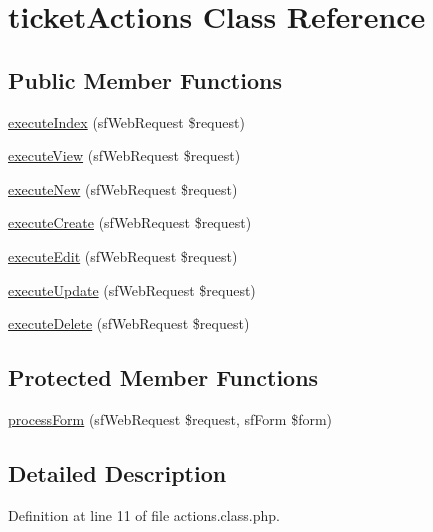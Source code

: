 \hypertarget{classticket_actions}{\section{ticket\-Actions Class Reference}
\label{classticket_actions}
}
\subsection*{Public Member Functions}
\begin{DoxyCompactItemize}
\item 
\hyperlink{classticket_actions_a948cc911eb1d9f77990be54af3b2080f}{execute\-Index} (sf\-Web\-Request \$request)
\item 
\hyperlink{classticket_actions_ad61d212fa3f7e8cb4190700a8a670606}{execute\-View} (sf\-Web\-Request \$request)
\item 
\hyperlink{classticket_actions_a0ffbea56560c6c633dae68ec22aff21c}{execute\-New} (sf\-Web\-Request \$request)
\item 
\hyperlink{classticket_actions_a75837617743fb64dca82d8133b2c662a}{execute\-Create} (sf\-Web\-Request \$request)
\item 
\hyperlink{classticket_actions_af4d8fedd4b28f3398826a1bb8fa54394}{execute\-Edit} (sf\-Web\-Request \$request)
\item 
\hyperlink{classticket_actions_af7b4f51862add3c2ebb54efc136a0840}{execute\-Update} (sf\-Web\-Request \$request)
\item 
\hyperlink{classticket_actions_a52b5b11b11a0070dd2662257520c045a}{execute\-Delete} (sf\-Web\-Request \$request)
\end{DoxyCompactItemize}
\subsection*{Protected Member Functions}
\begin{DoxyCompactItemize}
\item 
\hyperlink{classticket_actions_a7cf661d837626e0320753cbffa019a01}{process\-Form} (sf\-Web\-Request \$request, sf\-Form \$form)
\end{DoxyCompactItemize}


\subsection{Detailed Description}


Definition at line 11 of file actions.\-class.\-php.



